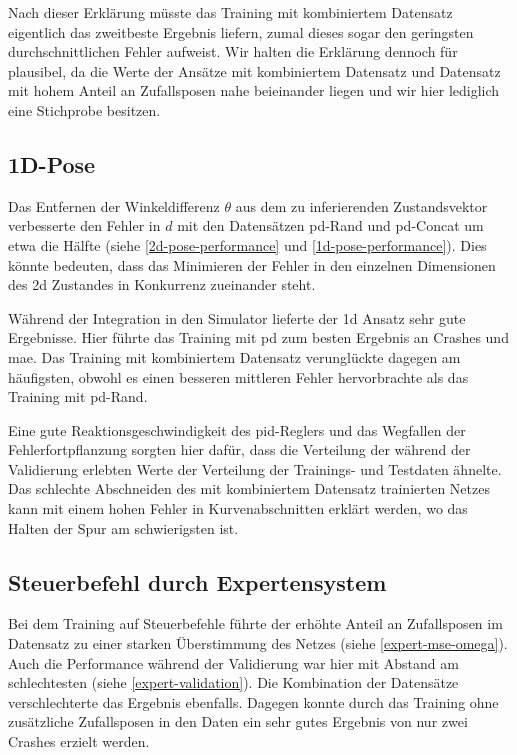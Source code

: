 Nach dieser Erklärung müsste das Training mit kombiniertem Datensatz eigentlich das zweitbeste Ergebnis liefern, zumal dieses sogar den geringsten durchschnittlichen Fehler aufweist. Wir halten die Erklärung dennoch für plausibel, da die Werte der Ansätze mit kombiniertem Datensatz und Datensatz mit hohem Anteil an Zufallsposen nahe beieinander liegen und wir hier lediglich eine Stichprobe besitzen.

\subsection{1D-Pose}

Das Entfernen der Winkeldifferenz $\theta$ aus dem zu inferierenden Zustandsvektor verbesserte den Fehler in $d$ mit den Datensätzen \glqq\acs{pd}-Rand\grqq{} und \glqq\acs{pd}-Concat\grqq{} um etwa die Hälfte (siehe \ref{2d-pose-performance} und \ref{1d-pose-performance}). Dies könnte bedeuten, dass das Minimieren der Fehler in den einzelnen Dimensionen des \acs{2d} Zustandes in Konkurrenz zueinander steht.

Während der Integration in den Simulator lieferte der \acs{1d} Ansatz sehr gute Ergebnisse. Hier führte das Training mit \glqq\acs{pd}\grqq{} zum besten Ergebnis an Crashes und \acs{mae}. Das Training mit kombiniertem Datensatz verunglückte dagegen am häufigsten, obwohl es einen besseren mittleren Fehler hervorbrachte als das Training mit \glqq\acs{pd}-Rand\grqq.

Eine gute Reaktionsgeschwindigkeit des \acs{pid}-Reglers und das Wegfallen der Fehlerfortpflanzung sorgten hier dafür, dass die Verteilung der während der Validierung erlebten Werte der Verteilung der Trainings- und Testdaten ähnelte. Das schlechte Abschneiden des mit kombiniertem Datensatz trainierten Netzes kann mit einem hohen Fehler in Kurvenabschnitten erklärt werden, wo das Halten der Spur am schwierigsten ist.

\subsection{Steuerbefehl durch Expertensystem}

Bei dem Training auf Steuerbefehle führte der erhöhte Anteil an Zufallsposen im Datensatz zu einer starken Überstimmung des Netzes (siehe \ref{expert-mse-omega}). Auch die Performance während der Validierung war hier mit Abstand am schlechtesten (siehe \ref{expert-validation}).  Die Kombination der Datensätze verschlechterte das Ergebnis ebenfalls. Dagegen konnte durch das Training ohne zusätzliche Zufallsposen in den Daten ein sehr gutes Ergebnis von nur zwei Crashes erzielt werden.

